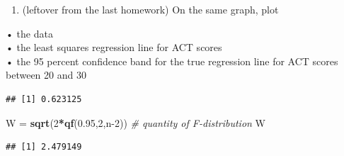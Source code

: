 \documentclass[
]{article}
\newenvironment{Shaded}{\begin{snugshade}}{\end{snugshade}}
\newcommand{\CommentTok}[1]{\textcolor[rgb]{0.56,0.35,0.01}{\textit{#1}}}
\newcommand{\DecValTok}[1]{\textcolor[rgb]{0.00,0.00,0.81}{#1}}
\newcommand{\FloatTok}[1]{\textcolor[rgb]{0.00,0.00,0.81}{#1}}
\newcommand{\KeywordTok}[1]{\textcolor[rgb]{0.13,0.29,0.53}{\textbf{#1}}}
\newcommand{\NormalTok}[1]{#1}
\newcommand{\OperatorTok}[1]{\textcolor[rgb]{0.81,0.36,0.00}{\textbf{#1}}}
\newcommand{\StringTok}[1]{\textcolor[rgb]{0.31,0.60,0.02}{#1}}
\providecommand{\tightlist}{%
  \setlength{\itemsep}{0pt}\setlength{\parskip}{0pt}}
\begin{document}
\begin{enumerate}
\def\labelenumi{(\alph{enumi})}
\setcounter{enumi}{5}
\tightlist
\item
  (leftover from the last homework) On the same graph, plot
\end{enumerate}

• the data\\
• the least squares regression line for ACT scores\\
• the 95 percent confidence band for the true regression line for ACT
scores between 20 and 30\\

\begin{Shaded}
\end{Shaded}

\begin{verbatim}
## [1] 0.623125
\end{verbatim}

\begin{Shaded}
\begin{Highlighting}[]
\NormalTok{W =}\StringTok{ }\KeywordTok{sqrt}\NormalTok{(}\DecValTok{2}\OperatorTok{*}\KeywordTok{qf}\NormalTok{(}\FloatTok{0.95}\NormalTok{,}\DecValTok{2}\NormalTok{,n}\DecValTok{-2}\NormalTok{))  }\CommentTok{# quantity of F-distribution}
\NormalTok{W}
\end{Highlighting}
\end{Shaded}

\begin{verbatim}
## [1] 2.479149
\end{verbatim}
\end{document}
